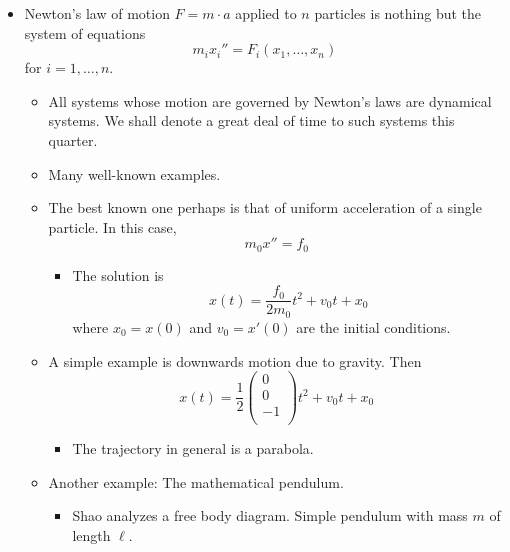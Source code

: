 \documentclass[../notes.tex]{subfiles}
\begin{document}
\begin{itemize}
\begin{itemize}
    \end{itemize}
    \item Newton's law of motion $F=m\cdot a$ applied to $n$ particles is nothing but the system of equations
    \begin{equation*}
        m_ix_i'' = F_i(x_1,\dots,x_n)
    \end{equation*}
    for $i=1,\dots,n$.
    \begin{itemize}
        \item All systems whose motion are governed by Newton's laws are dynamical systems. We shall denote a great deal of time to such systems this quarter.
        \item Many well-known examples.
        \item The best known one perhaps is that of uniform acceleration of a single particle. In this case,
        \begin{equation*}
            m_0x'' = f_0
        \end{equation*}
        \begin{itemize}
            \item The solution is
            \begin{equation*}
                x(t) = \frac{f_0}{2m_0}t^2+v_0t+x_0
            \end{equation*}
            where $x_0=x(0)$ and $v_0=x'(0)$ are the initial conditions.
        \end{itemize}
        \item A simple example is downwards motion due to gravity. Then
        \begin{equation*}
            x(t) = \frac{1}{2}
            \begin{pmatrix}
                0\\
                0\\
                -1\\
            \end{pmatrix}
            t^2+v_0t+x_0
        \end{equation*}
        \begin{itemize}
            \item The trajectory in general is a parabola.
        \end{itemize}
        \item Another example: The mathematical pendulum.
        \begin{itemize}
            \item Shao analyzes a free body diagram. Simple pendulum with mass $m$ of length $\ell$.

\end{itemize}
\end{itemize}
\end{itemize}
\end{document}
